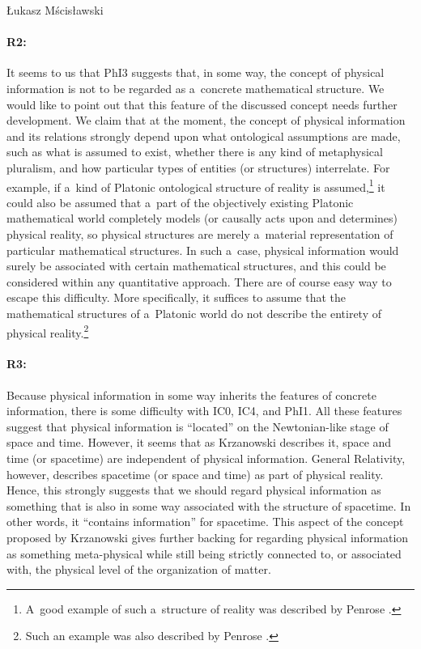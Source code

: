 \begin{artengenv}{Łukasz Mścisławski}
\paragraph{R2:} It seems to us that PhI3 suggests that, in some way, the concept of physical information is not to be regarded as a~concrete mathematical structure. We would like to point out that this feature of the discussed concept needs further development. We claim that at the moment, the concept of physical information and its relations strongly depend upon what ontological assumptions are made, such as what is assumed to exist, whether there is any kind of metaphysical pluralism, and how particular types of entities (or structures) interrelate. For example, if a~kind of Platonic ontological structure of reality is assumed,\footnote{A~good example of such a~structure of reality was described by Penrose
\parencite*[][pp.18–19]{penrose_road_2006}.%
} it could also be assumed that a~part of the objectively existing Platonic mathematical world completely models (or causally acts upon and determines) physical reality, so physical structures are merely a~material representation of particular mathematical structures. In such a~case, physical information would surely be associated with certain mathematical structures, and this could be considered within any quantitative approach. There are of course easy way to escape this difficulty. More specifically, it suffices to assume that the mathematical structures of a~Platonic world do not describe the entirety of physical reality.\footnote{Such an example was also described by Penrose 
\parencite*[][pp.19–21]{penrose_road_2006}.%
}

\paragraph{R3:} Because physical information in some way inherits the features of concrete information, there is some difficulty with IC0, IC4, and PhI1. All these features suggest that physical information is ``located'' on the Newtonian-like stage of space and time. However, it seems that as Krzanowski describes it, space and time (or spacetime) are independent of physical information. General Relativity, however, describes spacetime (or space and time) as part of physical reality. Hence, this strongly suggests that we should regard physical information as something that is also in some way associated with the structure of spacetime. In other words, it ``contains information'' for spacetime. This aspect of the concept proposed by Krzanowski gives further backing for regarding physical information as something meta-physical while still being strictly connected to, or associated with, the physical level of the organization of matter.


\end{artengenv}
